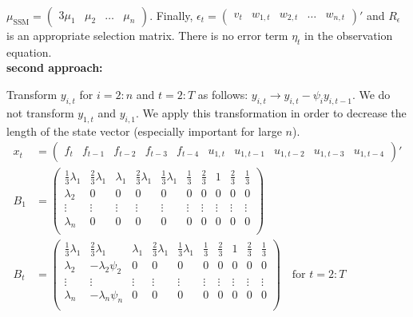 \documentclass[12pt,a4paper]{scrartcl}
\begin{document}
$\mu_\mathrm{SSM} = \begin{pmatrix} 3\mu_1& \mu_2 & \dots & \mu_n \end{pmatrix}$. Finally, $\epsilon_t = \begin{pmatrix} v_t & w_{1,t} & w_{2,t} & \dots & w_{n,t} \end{pmatrix}'$ and $R_\epsilon$ is an appropriate selection matrix. There is no error term $\eta_t$ in the observation equation.\\

\textbf{second approach:}

Transform $y_{i,t}$ for $i=2:n$ and $t=2:T$ as follows: $y_{i,t} \rightarrow y_{i,t} - \psi_i y_{i,t-1}$. We do not transform $y_{1,t}$ and $y_{i,1}$. We apply this transformation in order to decrease the length of the state vector (especially important for large $n$).
\begin{align*}
x_t &= \begin{pmatrix}
f_t & f_{t-1} & f_{t-2} & f_{t-3} & f_{t-4} & u_{1,t} & u_{1,t-1} & u_{1,t-2} & u_{1,t-3} & u_{1,t-4}
\end{pmatrix}' \\
B_1 &= \begin{pmatrix}
\frac{1}{3}\lambda_1 & \frac{2}{3}\lambda_1 & \lambda_1 & \frac{2}{3}\lambda_1 & \frac{1}{3} \lambda_1 & \frac{1}{3} & \frac{2}{3} & 1 & \frac{2}{3} & \frac{1}{3} \\
\lambda_2 & 0 & 0 & 0 & 0 & 0 & 0 & 0 & 0 & 0 \\
\vdots & \vdots & \vdots & \vdots & \vdots & \vdots & \vdots & \vdots & \vdots & \vdots \\
\lambda_n & 0 & 0 & 0 & 0 & 0 & 0 & 0 & 0 & 0 \\
\end{pmatrix} \\
B_t &= \begin{pmatrix}
\frac{1}{3}\lambda_1 & \frac{2}{3}\lambda_1 & \lambda_1 & \frac{2}{3}\lambda_1 & \frac{1}{3} \lambda_1 & \frac{1}{3} & \frac{2}{3} & 1 & \frac{2}{3} & \frac{1}{3} \\
\lambda_2 & -\lambda_2\psi_2 & 0 & 0 & 0 & 0 & 0 & 0 & 0 & 0 \\
\vdots & \vdots & \vdots & \vdots & \vdots & \vdots & \vdots & \vdots & \vdots & \vdots \\
\lambda_n & -\lambda_n\psi_n & 0 & 0 & 0 & 0 & 0 & 0 & 0 & 0 \\
\end{pmatrix} \quad \text{for $t=2:T$}
\end{align*}
\end{document}
